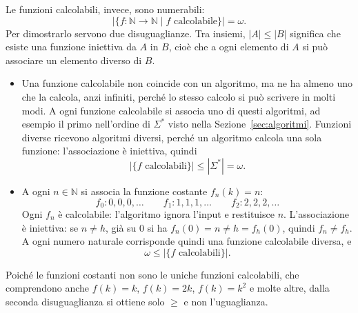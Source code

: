 \documentclass[a4paper, 11pt, oneside]{book}
\theoremstyle{formale}
\begin{document}
    Le funzioni calcolabili, invece, sono numerabili:
    \begin{equation*}
        |\{f \colon \mathbb{N} \to \mathbb{N} \mid f \text{ calcolabile}\}| = \omega.
    \end{equation*}
    Per dimostrarlo servono due disuguaglianze. Tra insiemi, $|A| \leq |B|$ significa
    che esiste una funzione iniettiva da $A$ in $B$, cio\`e che a ogni elemento di $A$ si
    pu\`o associare un elemento diverso di $B$.
    \begin{itemize}[leftmargin=3em]
        \item[($\leq$)] Una funzione calcolabile non coincide con un algoritmo, ma ne ha
            almeno uno che la calcola, anzi infiniti, perch\'e lo stesso calcolo si pu\`o
            scrivere in molti modi. A ogni funzione calcolabile si associa uno di questi
            algoritmi, ad esempio il primo nell'ordine di $\Sigma^*$ visto nella
            Sezione~\ref{sec:algoritmi}. Funzioni diverse ricevono algoritmi diversi,
            perch\'e un algoritmo calcola una sola funzione: l'associazione \`e
            iniettiva, quindi
            \begin{equation*}
                |\{f \text{ calcolabili}\}| \leq |\Sigma^*| = \omega.
            \end{equation*}
        \item[($\geq$)] A ogni $n \in \mathbb{N}$ si associa la funzione costante
            $f_n(k) = n$:
            \begin{equation*}
                f_0 \colon 0, 0, 0, \dots \qquad
                f_1 \colon 1, 1, 1, \dots \qquad
                f_2 \colon 2, 2, 2, \dots
            \end{equation*}
            Ogni $f_n$ \`e calcolabile: l'algoritmo ignora l'input e restituisce $n$.
            L'associazione \`e iniettiva: se $n \neq h$, gi\`a su $0$ si ha
            $f_n(0) = n \neq h = f_h(0)$, quindi $f_n \neq f_h$. A ogni numero naturale
            corrisponde quindi una funzione calcolabile diversa, e
            \begin{equation*}
                \omega \leq |\{f \text{ calcolabili}\}|.
            \end{equation*}
    \end{itemize}

    Poich\'e le funzioni costanti non sono le uniche funzioni calcolabili, che
    comprendono anche $f(k) = k$, $f(k) = 2k$, $f(k) = k^2$ e molte altre, dalla seconda
    disuguaglianza si ottiene solo $\geq$ e non l'uguaglianza.
\end{document}
